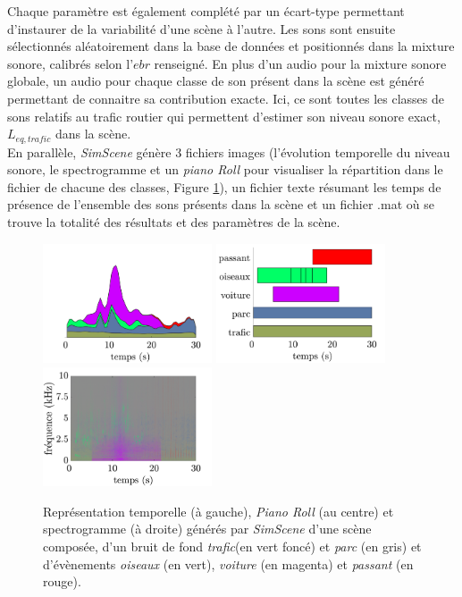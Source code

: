
Chaque paramètre est également complété par un écart-type permettant d'instaurer de la variabilité d'une scène à l'autre. Les sons sont ensuite sélectionnés aléatoirement dans la base de données et positionnés dans la mixture sonore, calibrés selon l'$ebr$ renseigné. En plus d'un audio pour la mixture sonore globale, un audio pour chaque classe de son présent dans la scène est généré permettant de connaitre sa contribution exacte. Ici, ce sont toutes les classes de sons relatifs au trafic routier qui permettent d'estimer son niveau sonore exact, $L_{eq,trafic}$ dans la scène.\\

En parallèle, \textit{SimScene} génère 3 fichiers images (l'évolution temporelle du niveau sonore, le spectrogramme et un \textit{piano Roll} pour visualiser la répartition dans le fichier de chacune des classes, Figure \ref{fig:somefiglabel}), un fichier texte résumant les temps de présence de l'ensemble des sons présents dans la scène et un fichier .mat où se trouve la totalité des résultats et des paramètres de la scène.\\


\begin{figure}[ht]
\includegraphics[width=5cm]{./figures/SimScene/exemple-timeDomain.pdf}\hfill
\includegraphics[width=5cm]{./figures/SimScene/exemple-pianoRoll.pdf}\hfill
\includegraphics[width=5cm]{./figures/SimScene/exemple-spectrum.pdf}
\caption{Représentation temporelle (à gauche), \textit{Piano Roll} (au centre) et spectrogramme (à droite) générés par \textit{SimScene} d'une scène composée, d'un bruit de fond \textit{trafic}(en vert foncé) et \textit{parc} (en gris) et d'évènements \textit{oiseaux} (en vert), \textit{voiture} (en magenta) et \textit{passant} (en rouge).}\label{fig:somefiglabel}
\end{figure}

